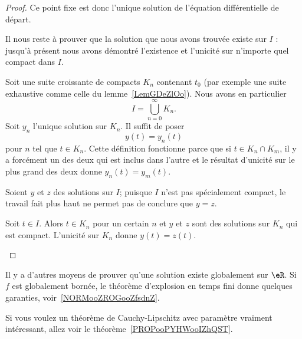 \begin{proof}
	Ce point fixe est donc l'unique solution de l'équation différentielle de départ.

	\begin{subproof}
		Il nous reste à prouver que la solution que nous avons trouvée existe sur \( I\) : jusqu'à présent nous avons démontré l'existence et l'unicité sur n'importe quel compact dans \( I\).

		Soit une suite croissante de compacts \( K_n\) contenant \( t_0\) (par exemple une suite exhaustive comme celle du lemme~\ref{LemGDeZlOo}). Nous avons en particulier
		\begin{equation}
			I=\bigcup_{n=0}^{\infty}K_n.
		\end{equation}
		Soit \( y_n\) l'unique solution sur \( K_n\). Il suffit de poser
		\begin{equation}
			y(t)=y_n(t)
		\end{equation}
		pour \( n\) tel que \( t\in K_n\). Cette définition fonctionne parce que si \( t\in K_n\cap K_m\), il y a forcément un des deux qui est inclus dans l'autre et le résultat d'unicité sur le plus grand des deux donne \( y_n(t)=y_m(t)\).


		Soient \( y\) et \(z \) des solutions sur \( I\); puisque \( I\) n'est pas spécialement compact, le travail fait plus haut ne permet pas de conclure que \( y=z\).

		Soit \( t\in I\). Alors \( t\in K_n\) pour un certain \( n\) et \( y\) et \( z\) sont des solutions sur \( K_n\) qui est compact. L'unicité sur \( K_n\) donne \( y(t)=z(t)\).
	\end{subproof}
\end{proof}

\begin{normaltext}
	Il y a d'autres moyens de prouver qu'une solution existe globalement sur \( \eR\). Si \( f\) est globalement bornée, le théorème d'explosion en temps fini donne quelques garanties, voir~\ref{NORMooZROGooZfsdnZ}.
\end{normaltext}

Si vous voulez un théorème de Cauchy-Lipschitz avec paramètre vraiment intéressant, allez voir le théorème~\ref{PROPooPYHWooIZhQST}.

